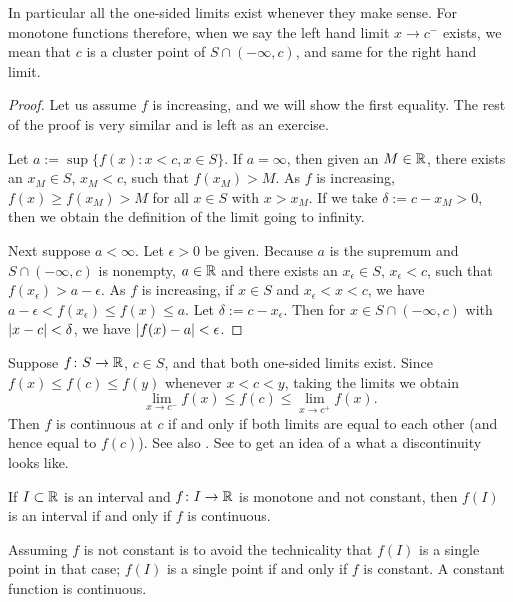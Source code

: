 In particular all the one-sided limits exist whenever they make
sense.  For monotone functions therefore, when we say
the left hand limit $x \to c^-$
exists, we mean that $c$ is a cluster point of $S \cap (-\infty,c)$,
and same for the right hand limit.

\begin{proof}
Let us assume $f$ is increasing, and we will show the first
equality.  The rest of the proof is very similar and is left as an
exercise.

Let $a := \sup \{ f(x) : x < c, x \in S \}$.  If $a = \infty$,
then given an $M \in {\mathbb{R}}$, there exists an $x_M \in S$, $x_M < c$, such that $f(x_M) > M$. 
As $f$ is increasing, $f(x) \geq f(x_M) >  M$ for all $x \in S$ with $x > x_M$.  If
we take $\delta := c-x_M > 0$, then we obtain the definition of the limit going to
infinity.

Next suppose $a < \infty$.
Let $\epsilon > 0$ be given.  Because $a$ is the supremum and
$S \cap (-\infty,c)$ is nonempty, $a \in {\mathbb{R}}$ and
there exists an
$x_\epsilon \in S$,
$x_\epsilon < c$,
such that $f(x_\epsilon) > a-\epsilon$.  As $f$ is increasing,
if $x \in S$ and $x_\epsilon < x < c$, we have
$a-\epsilon < f(x_\epsilon) \leq f(x) \leq a$.  Let
$\delta := c-x_\epsilon$.  Then for $x \in S \cap (-\infty,c)$
with $\left\lvert {x-c} \right\rvert < \delta$,
we have $\left\lvert {f(x)-a} \right\rvert < \epsilon$.
\end{proof}

Suppose $f \colon S \to {\mathbb{R}}$, $c \in S$, and
that both one-sided limits exist.
Since $f(x) \leq f(c) \leq f(y)$
whenever $x < c < y$, taking the limits we obtain
\begin{equation*}
\lim_{x \to c^-} f(x) \leq f(c) \leq \lim_{x \to c^+} f(x) .
\end{equation*}
Then $f$ is continuous at $c$ if and only if both limits are equal
to each other (and hence equal to $f(c)$).  See also
.
See  to get an idea of a what a discontinuity
looks like.


\begin{cor} \label{cor:continterval}
If $I \subset {\mathbb{R}}$ is an interval and $f \colon I \to {\mathbb{R}}$ is 
monotone and not constant, then $f(I)$ is an interval if and only if $f$
is continuous.
\end{cor}

Assuming $f$ is not constant is to avoid the technicality
that $f(I)$ is a single point in that case; $f(I)$ is a single
point if and only if $f$ is constant.  A constant function is 
continuous.

